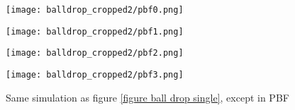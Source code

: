 \begin{figure}[H]
    \centering
    
    \begin{minipage}[t]{.24\linewidth}
        \centering
        \vspace{0pt}
        \texttt{[image: balldrop\_cropped2/pbf0.png]}
    \end{minipage}
    \begin{minipage}[t]{.24\linewidth}
        \centering
        \vspace{0pt}
        \texttt{[image: balldrop\_cropped2/pbf1.png]}
    \end{minipage}
    \begin{minipage}[t]{.24\linewidth}
        \centering
        \vspace{0pt}
        \texttt{[image: balldrop\_cropped2/pbf2.png]}
    \end{minipage}
    \begin{minipage}[t]{.24\linewidth}
        \centering
        \vspace{0pt}
        \texttt{[image: balldrop\_cropped2/pbf3.png]}
    \end{minipage}

    \caption{Same simulation as figure \ref{figure ball drop single}, except in PBF}
    \label{figure ball drop pbf}
\end{figure}
